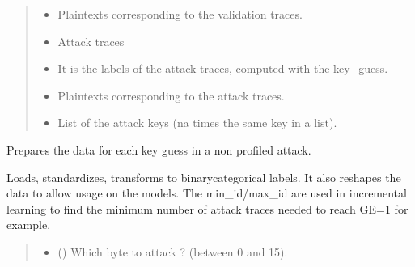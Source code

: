 \documentclass[letterpaper,10pt,english]{sphinxmanual}
\begin{document}
\begin{fulllineitems}
\begin{fulllineitems}
\begin{quote}
\begin{description}
\begin{itemize}
\item {} 
\sphinxAtStartPar
{} \textendash{} Plaintexts corresponding to the validation traces.

\item {} 
\sphinxAtStartPar
{} \textendash{} Attack traces

\item {} 
\sphinxAtStartPar
{} \textendash{} It is the labels of the attack traces, computed with the key\_guess.

\item {} 
\sphinxAtStartPar
{} \textendash{} Plaintexts corresponding to the attack traces.

\item {} 
\sphinxAtStartPar
{} \textendash{} List of the attack keys (na times the same key in a list).

\end{itemize}


\end{description}\end{quote}

\end{fulllineitems}


\begin{fulllineitems}
\label{\detokenize{MLSCAlib.Data:MLSCAlib.Data.data_manager.DataManager.prepare_unprofiled_data}}
\pysigstartsignatures
{}
\pysigstopsignatures
\sphinxAtStartPar
Prepares the data for each key guess in a non profiled attack.

\sphinxAtStartPar
Loads, standardizes, transforms to binary\sphinxhyphen{}categorical labels. It also reshapes the
data to allow usage on the models. The min\_id/max\_id are used in incremental learning
to find the minimum number of attack traces needed to reach GE=1 for example.
\begin{quote}\begin{description}
\begin{itemize}
\item {} 
\sphinxAtStartPar
{} () \textendash{} Which byte to attack ? (between 0 and 15).


\end{itemize}
\end{description}
\end{quote}
\end{fulllineitems}
\end{fulllineitems}
\end{document}
